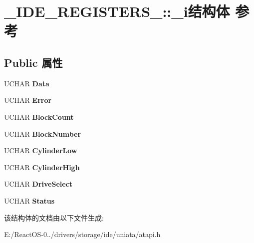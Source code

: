 \hypertarget{struct___i_d_e___r_e_g_i_s_t_e_r_s__1_1_1__i}{}\section{\+\_\+\+I\+D\+E\+\_\+\+R\+E\+G\+I\+S\+T\+E\+R\+S\+\_\+:\+:\+\_\+i结构体 参考}
\label{struct___i_d_e___r_e_g_i_s_t_e_r_s__1_1_1__i}
\subsection*{Public 属性}
\begin{DoxyCompactItemize}
\item 
\mbox{\label{struct___i_d_e___r_e_g_i_s_t_e_r_s__1_1_1__i_abdc6a87ad5e8ee8875eb648f87a1feaa}} 
U\+C\+H\+AR {\bfseries Data}
\item 
\mbox{\label{struct___i_d_e___r_e_g_i_s_t_e_r_s__1_1_1__i_a6366c204a6f18977dd29ff39ae7d8af5}} 
U\+C\+H\+AR {\bfseries Error}
\item 
\mbox{\label{struct___i_d_e___r_e_g_i_s_t_e_r_s__1_1_1__i_a3a366f1251931ebba86352c1e801e9ee}} 
U\+C\+H\+AR {\bfseries Block\+Count}
\item 
\mbox{\label{struct___i_d_e___r_e_g_i_s_t_e_r_s__1_1_1__i_a5594a51c2ae3c35bd883321469d087c0}} 
U\+C\+H\+AR {\bfseries Block\+Number}
\item 
\mbox{\label{struct___i_d_e___r_e_g_i_s_t_e_r_s__1_1_1__i_a42162a74c7500ff8bc651da3de7abd1a}} 
U\+C\+H\+AR {\bfseries Cylinder\+Low}
\item 
\mbox{\label{struct___i_d_e___r_e_g_i_s_t_e_r_s__1_1_1__i_ad9de3304133cadc4c42066624bcdb312}} 
U\+C\+H\+AR {\bfseries Cylinder\+High}
\item 
\mbox{\label{struct___i_d_e___r_e_g_i_s_t_e_r_s__1_1_1__i_a88731c606c1159bdf1894b4a3d89724f}} 
U\+C\+H\+AR {\bfseries Drive\+Select}
\item 
\mbox{\label{struct___i_d_e___r_e_g_i_s_t_e_r_s__1_1_1__i_a639981897d271d4c67259d369d0554e5}} 
U\+C\+H\+AR {\bfseries Status}
\end{DoxyCompactItemize}


该结构体的文档由以下文件生成\+:\begin{DoxyCompactItemize}
\item 
E\+:/\+React\+O\+S-\/0../drivers/storage/ide/uniata/atapi.\+h\end{DoxyCompactItemize}
